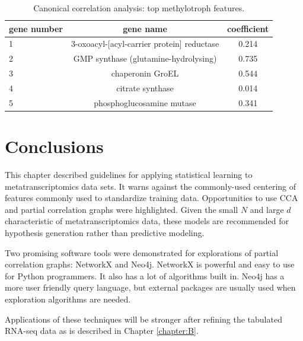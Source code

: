 \begin{table}[H]
\centering
\begin{singlespace}
\caption[Canonical correlation analysis: top features]{Canonical correlation analysis: top methylotroph features.}
\begin{tabular}{l | c | c}
          gene number & gene name & coefficient  \\
\midrule
	1 & 3-oxoacyl-[acyl-carrier protein] reductase & 0.214 \\
	2 & GMP synthase (glutamine-hydrolysing) & 0.735 \\
	3 & chaperonin GroEL & 0.544 \\
	4 & citrate synthase & 0.014 \\
	5 & phosphoglucosamine mutase & 0.341 \\
\end{tabular}
\label{table:CCA_methylotroph}
\end{singlespace}
\end{table}

\section{Conclusions}

This chapter described guidelines for applying statistical learning to metatranscriptomics data sets.
It warns against the commonly-used centering of features commonly used to standardize training data.
Opportunities to use CCA and partial correlation graphs were highlighted.
Given the small $N$ and large $d$ characteristic of metatranscriptomics data, these models are recommended for hypothesis generation rather than predictive modeling.

Two promising software tools were demonstrated for explorations of partial correlation graphs: NetworkX and Neo4j.
NetworkX is powerful and easy to use for Python programmers.  It also has a lot of algorithms built in.
Neo4j has a more user friendly query language, but external packages are usually used when exploration algorithms are needed.

Applications of these techniques will be stronger after refining the tabulated RNA-seq data as is described in Chapter \ref{chapter:B}.

